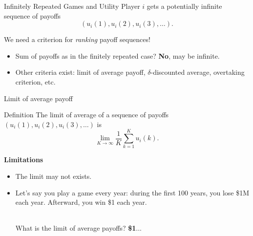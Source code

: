 \begin{frame}{Infinitely Repeated Games and Utility}
    Player $i$ gets a potentially infinite sequence of payoffs
    \[ (u_i(1), u_i(2), u_i(3), \dots). \]

    \begin{alertblock}{We need a criterion for \textit{ranking} payoff sequences!}
        \pause
        \begin{itemize}
            \item Sum of payoffs as in the finitely repeated case? \textbf{No}, may be
            infinite. \pause
            \item Other criteria exist: limit of average payoff, $\delta$-discounted average,
            {\color{gray}overtaking criterion}, etc.
        \end{itemize}
    \end{alertblock}
\end{frame}


\begin{frame}{Limit of average payoff}
    \begin{block}{Definition}
        The limit of average of a sequence of payoffs $(u_i(1), u_i(2), u_i(3), \dots)$ is
        \[ \lim_{K\to\infty} \frac{1}{K} \sum_{k=1}^K u_i(k). \]
    \end{block}
    
    \textbf{{\color{orange}Limitations}}\\
    \pause
    \begin{itemize}
        \item The limit may not exists. \pause
        \item Let's say you play a game every year: during the first 100 years, you lose \$1M
        each year. Afterward, you win \$1 each year.\\\
            
        What is the limit of average payoffs? \pause \textbf{{\color{orange}\$1}}...
    \end{itemize}
\end{frame}

